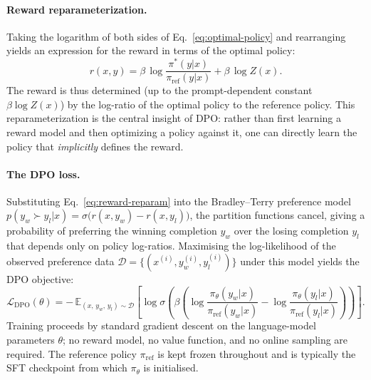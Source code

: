 \paragraph{Reward reparameterization.}
Taking the logarithm of both sides of Eq.~\eqref{eq:optimal-policy} and
rearranging yields an expression for the reward in terms of the optimal policy:
\begin{equation}
\label{eq:reward-reparam}
r(x,y) = \beta\,\log\frac{\pi^{*}(y|x)}{\pi_{\text{ref}}(y|x)}
        + \beta\,\log Z(x).
\end{equation}
The reward is thus determined (up to the prompt-dependent constant
$\beta\log Z(x)$) by the log-ratio of the optimal policy to the reference
policy.  This reparameterization is the central insight of DPO: rather than
first learning a reward model and then optimizing a policy against it, one can
directly learn the policy that \emph{implicitly} defines the reward.

\paragraph{The DPO loss.}
Substituting Eq.~\eqref{eq:reward-reparam} into the Bradley--Terry preference
model~\cite{bradley1952rank}
$p(y_w \succ y_l | x) = \sigma\!\bigl(r(x,y_w) - r(x,y_l)\bigr)$,
the partition functions cancel, giving a probability of preferring the winning
completion $y_w$ over the losing completion $y_l$ that depends only on
policy log-ratios.  Maximising the log-likelihood of the observed preference
data $\mathcal{D} = \{(x^{(i)}, y_w^{(i)}, y_l^{(i)})\}$ under this model
yields the DPO objective:
\begin{equation}
\label{eq:dpo-loss}
\boxed{
\mathcal{L}_{\text{DPO}}(\theta)
  = -\,\mathbb{E}_{(x,\,y_w,\,y_l)\sim\mathcal{D}}\!
    \left[\log\sigma\!\left(
      \beta\left(
        \log\frac{\pi_{\theta}(y_w|x)}{\pi_{\text{ref}}(y_w|x)}
      - \log\frac{\pi_{\theta}(y_l|x)}{\pi_{\text{ref}}(y_l|x)}
      \right)
    \right)\right].}
\end{equation}
Training proceeds by standard gradient descent on the language-model parameters
$\theta$; no reward model, no value function, and no online sampling are
required.  The reference policy $\pi_{\text{ref}}$ is kept frozen throughout
and is typically the SFT checkpoint from which $\pi_{\theta}$ is initialised.

